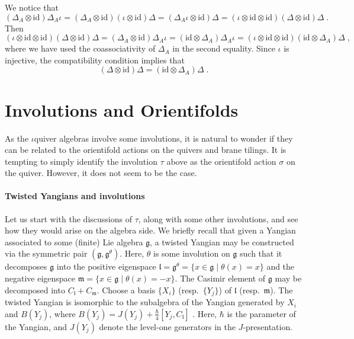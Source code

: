 \documentclass[11pt]{article}
\numberwithin{equation}{section}
\numberwithin{figure}{section}
\numberwithin{table}{section}
\begin{document}
We notice that
\begin{equation}
	(\Delta_A\otimes\mathrm{id})\Delta_A\iota=(\Delta_A\otimes\mathrm{id})(\iota\otimes\mathrm{id})\Delta=(\Delta_A\iota\otimes\mathrm{id})\Delta=(\iota\otimes\mathrm{id}\otimes\mathrm{id})(\Delta\otimes\mathrm{id})\Delta\;.
\end{equation}
Then
\begin{equation}
	(\iota\otimes\mathrm{id}\otimes\mathrm{id})(\Delta\otimes\mathrm{id})\Delta=(\Delta_A\otimes\mathrm{id})\Delta_A\iota=(\mathrm{id}\otimes\Delta_A)\Delta_A\iota=(\iota\otimes\mathrm{id}\otimes\mathrm{id})(\mathrm{id}\otimes\Delta_A)\Delta\;,
\end{equation}
where we have used the coassociativity of $\Delta_A$ in the second equality. Since $\iota$ is injective, the compatibility condition implies that
\begin{equation}
	(\Delta\otimes\mathrm{id})\Delta=(\mathrm{id}\otimes\Delta_A)\Delta\;.
\end{equation}

\section{Involutions and Orientifolds}\label{involutions}
As the $\iota$quiver algebras involve some involutions, it is natural to wonder if they can be related to the orientifold actions on the quivers and brane tilings. It is tempting to simply identify the involution $\tau$ above as the orientifold action $\sigma$ on the quiver. However, it does not seem to be the case.

\paragraph{Twisted Yangians and involutions} Let us start with the discussions of $\tau$, along with some other involutions, and see how they would arise on the algebra side. We briefly recall that given a Yangian associated to some (finite) Lie algebra $\mathfrak{g}$, a twisted Yangian may be constructed via the symmetric pair $\left(\mathfrak{g},\mathfrak{g}^\theta\right)$. Here, $\theta$ is some involution on $\mathfrak{g}$ such that it decomposes $\mathfrak{g}$ into the positive eigenspace $\mathfrak{l}=\mathfrak{g}^\theta=\{x\in\mathfrak{g}\;|\;\theta(x)=x\}$ and the negative eigenspace $\mathfrak{m}=\{x\in\mathfrak{g}\;|\;\theta(x)=-x\}$. The Casimir element of $\mathfrak{g}$ may be decomposed into $C_\mathfrak{l}+C_\mathfrak{m}$. Choose a basis $\{X_i\}$ (resp.~$\{Y_j\}$) of $\mathfrak{l}$ (resp.~$\mathfrak{m}$). The twisted Yangian is isomorphic to the subalgebra of the Yangian generated by $X_i$ and $B(Y_j)$, where $B(Y_j)=J(Y_j)+\frac{\hbar}{4}[Y_j,C_\mathfrak{l}]$ \cite{Belliard:2014uja}. Here, $\hbar$ is the parameter of the Yangian, and $J(Y_j)$ denote the level-one generators in the $J$-presentation.
\end{document}

